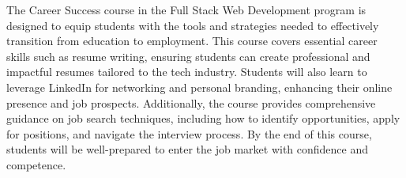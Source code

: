 The Career Success course in the Full Stack Web Development program is designed to equip students with the tools and strategies needed to effectively transition from education to employment.
This course covers essential career skills such as resume writing, ensuring students can create professional and impactful resumes tailored to the tech industry.
Students will also learn to leverage LinkedIn for networking and personal branding, enhancing their online presence and job prospects.
Additionally, the course provides comprehensive guidance on job search techniques, including how to identify opportunities, apply for positions, and navigate the interview process.
By the end of this course, students will be well-prepared to enter the job market with confidence and competence.

